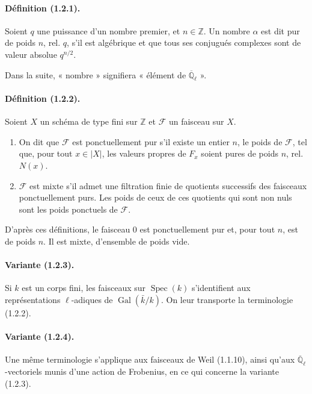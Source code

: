 \documentclass[11pt]{article}
\theoremstyle{remark}
\newcommand{\Qlb}{\overline{\mathbb{Q}}_\ell}
\newcommand{\ZZ}{\mathbb{Z}}
\newcommand{\Spec}{\operatorname{Spec}}
\newcommand{\Gal}{\operatorname{Gal}}
\begin{document}
\paragraph{Définition (1.2.1).} Soient $q$ une puissance d'un nombre premier, et $n\in\ZZ$. Un nombre $\alpha$ est dit pur de poids $n$, rel. $q$, s'il est algébrique et que tous ses conjugués complexes sont de valeur absolue $q^{n/2}$.

Dans la suite, « nombre » signifiera « élément de $\Qlb$ ».

\paragraph{Définition (1.2.2).} Soient $X$ un schéma de type fini sur $\ZZ$ et $\mathcal F$ un faisceau sur $X$.
\begin{enumerate}[label=(\roman*)]
\item On dit que $\mathcal F$ est ponctuellement pur s'il existe un entier $n$, le poids de $\mathcal F$, tel que, pour tout $x\in |X|$, les valeurs propres de $F_x$ soient pures de poids $n$, rel. $N(x)$.
\item $\mathcal F$ est mixte s'il admet une filtration finie de quotients successifs des faisceaux ponctuellement purs. Les poids de ceux de ces quotients qui sont non nuls sont les poids ponctuels de $\mathcal F$.
\end{enumerate}

D'après ces définitions, le faisceau $0$ est ponctuellement pur et, pour tout $n$, est de poids $n$. Il est mixte, d'ensemble de poids vide.

\paragraph{Variante (1.2.3).} Si $k$ est un corps fini, les faisceaux sur $\Spec(k)$ s'identifient aux représentations $\ell$-adiques de $\Gal(\bar k/k)$. On leur transporte la terminologie (1.2.2).

\paragraph{Variante (1.2.4).} Une même terminologie s'applique aux faisceaux de Weil (1.1.10), ainsi qu'aux $\Qlb$-vectoriels munis d'une action de Frobenius, en ce qui concerne la variante (1.2.3).
\end{document}
